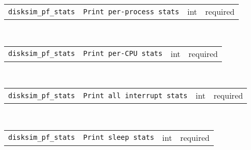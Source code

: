 \noindent 
\begin{tabular}{|p{\lpmodwidth}|p{\lpnamewidth}|p{0.5in}|p{0.5in}|}
\cline{1-4}
\texttt{disksim\_pf\_stats} & \texttt{Print per-process stats} & int & required \\ 
\cline{1-4}
\end{tabular}\\ 
\noindent 
\begin{tabular}{|p{\lpmodwidth}|p{\lpnamewidth}|p{0.5in}|p{0.5in}|}
\cline{1-4}
\texttt{disksim\_pf\_stats} & \texttt{Print per-CPU stats} & int & required \\ 
\cline{1-4}
\end{tabular}\\ 
\noindent 
\begin{tabular}{|p{\lpmodwidth}|p{\lpnamewidth}|p{0.5in}|p{0.5in}|}
\cline{1-4}
\texttt{disksim\_pf\_stats} & \texttt{Print all interrupt stats} & int & required \\ 
\cline{1-4}
\end{tabular}\\ 
\noindent 
\begin{tabular}{|p{\lpmodwidth}|p{\lpnamewidth}|p{0.5in}|p{0.5in}|}
\cline{1-4}
\texttt{disksim\_pf\_stats} & \texttt{Print sleep stats} & int & required \\ 
\cline{1-4}
\end{tabular}\\ 
